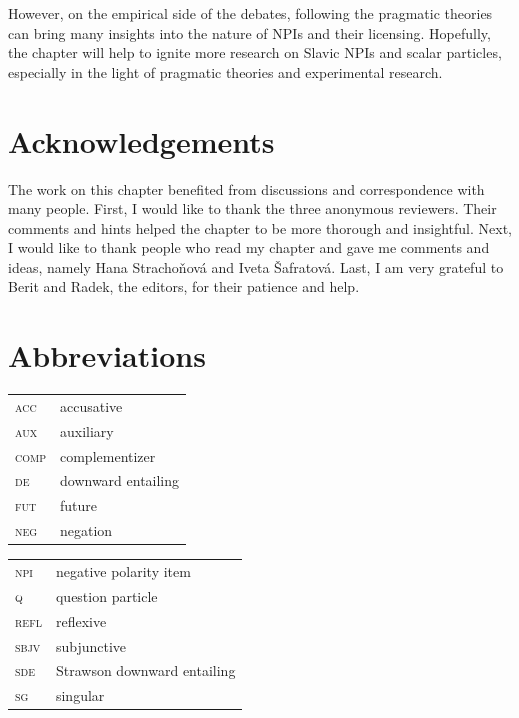 \documentclass[output=paper,colorlinks,citecolor=brown]{langscibook}
\begin{document}
However, on the empirical side of the debates, following the pragmatic theories can bring many insights into the nature of NPIs and their licensing. Hopefully, the chapter will help to ignite more research on Slavic NPIs and scalar particles, especially in the light of pragmatic theories and experimental research. 

\section*{Acknowledgements}
The work on this chapter benefited from discussions and correspondence with many people. First, I would like to thank the three anonymous reviewers. Their comments and hints helped the chapter to be more thorough and insightful. Next, I would like to thank people who read my chapter and gave me comments and ideas, namely Hana Strachoňová and Iveta Šafratová. Last, I am very grateful to Berit and Radek, the editors, for their patience and help.


\section*{Abbreviations}

\begin{tabularx}{.5\textwidth}{@{}lX@{}}
\textsc{acc}&{accusative}\\
\textsc{aux}&{auxiliary}\\
\textsc{comp}&{complementizer}\\
\textsc{de}&{downward entailing}\\
\textsc{fut}&{future}\\
\textsc{neg}&negation\\



\end{tabularx}%
\begin{tabularx}{.5\textwidth}{@{}lX@{}}
\textsc{npi}&{negative polarity item}\\
\textsc{q}&question particle\\
\textsc{refl}&{reflexive}\\
\textsc{sbjv}&{subjunctive}\\
\textsc{sde}&{Strawson downward entailing}\\
\textsc{sg}&singular\\

\end{tabularx}

{\sloppy\printbibliography[heading=subbibliography,notkeyword=this]}
\end{document}
